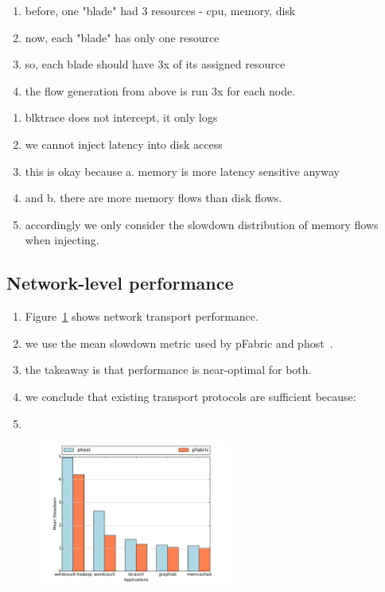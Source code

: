 \begin{enumerate}
\item before, one "blade" had 3 resources - cpu, memory, disk
\item now, each "blade" has only one resource
\item so, each blade should have 3x of its assigned resource
\item the flow generation from above is run 3x for each node.
\end{enumerate}

\begin{enumerate}
\item blktrace does not intercept, it only logs
\item we cannot inject latency into disk access
\item this is okay because a. memory is more latency sensitive anyway 
\item and b. there are more memory flows than disk flows.
\item accordingly we only consider the slowdown distribution of memory flows when injecting.
\end{enumerate}

\subsection{Network-level performance}
\begin{enumerate}
\item Figure~\ref{fig:phostp} shows network transport performance.
\item we use the mean slowdown metric used by pFabric and phost~\cite{pfabric, phost}.
\item the takeaway is that performance is near-optimal for both.
\item we conclude that existing transport protocols are sufficient because:
\item {}
\end{enumerate}
\label{ssec:nlp}

%
\begin{figure}
  \centering
    \includegraphics[width = 2.5in]{img/fig12_slowdownsGraph} 
  \caption{\small{}}
  \label{fig:phostp}
\end{figure}
%

